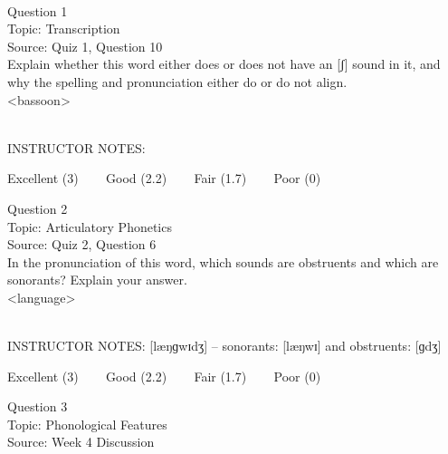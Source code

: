 \documentclass[12pt]{article}
\begin{document}
\begin{center}
\textbf{{\color{red}{\HUGE END OF EXAM}}}\\

\end{center}
\newpage

\begin{center}
\textbf{{\color{blue}{\HUGE START OF EXAM\\}}}

\textbf{{\color{blue}{\HUGE Student ID: 11196\\}}}

\textbf{{\color{blue}{\HUGE \\}}}

\end{center}
\newpage

{\large Question 1}\\

Topic: Transcription\\
Source: Quiz 1, Question 10\\

Explain whether this word either does or does not have an [ʃ] sound in it, and why the spelling and pronunciation either do or do not align.\\

<bassoon>


~\\
INSTRUCTOR NOTES: 


\vfill
Excellent (3) ~~~ Good (2.2) ~~~ Fair (1.7) ~~~ Poor (0)
\newpage

{\large Question 2}\\

Topic: Articulatory Phonetics\\
Source: Quiz 2, Question 6\\

In the pronunciation of this word, which sounds are obstruents and which are sonorants? Explain your answer.\\

<language>


~\\
INSTRUCTOR NOTES: [læŋɡwɪdʒ] -- sonorants: [læŋwɪ] and obstruents: [ɡdʒ]


\vfill
Excellent (3) ~~~ Good (2.2) ~~~ Fair (1.7) ~~~ Poor (0)
\newpage

{\large Question 3}\\

Topic: Phonological Features\\
Source: Week 4 Discussion\\
\end{document}
